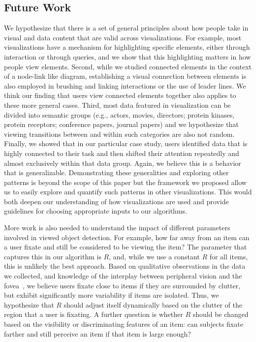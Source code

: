 \subsection{Future Work}
\label{sec:FutureWork}
We hypothesize that there is a set of general principles about how people take in visual and data content that are valid across visualizations. For example, most visualizations have a mechanism for highlighting specific elements, either through interaction or through queries, and we show that this highlighting matters in how people view elements. Second, while we studied connected elements in the context of a node-link like diagram, establishing a visual connection between elements is also employed in brushing and linking interactions or the use of leader lines. We think our finding that users view connected elements together also applies to these more general cases. Third, most data featured in visualization can be divided into semantic groups (e.g., actors, movies, directors; protein kinases, protein receptors; conference papers, journal papers) and we hypothesize that viewing transitions between and within such categories are also not random. Finally, we showed that in our particular case study, users identified data that is highly connected to their task and then shifted their attention repeatedly and almost exclusively within that data group. Again, we believe this is a behavior that is generalizable. Demonstrating these generalities and exploring other patterns is beyond the scope of this paper but the framework we proposed allow us to easily explore and quantify such patterns in other visualizations. This would both deepen our understanding of how visualizations are used and provide guidelines for choosing appropriate inputs to our algorithms. 

More work is also needed to understand the impact of different parameters involved in viewed object detection. For example, how far away from an item can a user fixate and still be considered to be viewing the item? The parameter that captures this in our algorithm is $R$, and, while we use a constant $R$ for all items, this is unlikely the best approach. Based on qualitative observations in the data we collected,  and knowledge of the interplay between peripheral vision and the fovea~\cite{balas2009summary}, we believe users fixate close to items if they are surrounded by clutter,  but exhibit significantly more variability if items are isolated. Thus, we hypothesize that $R$ should adjust itself dynamically based on the clutter of the region that a user is fixating.  A further question is whether $R$ should be changed based on the visibility or discriminating features of an item: can subjects fixate farther and still perceive an item if that item is large enough?

